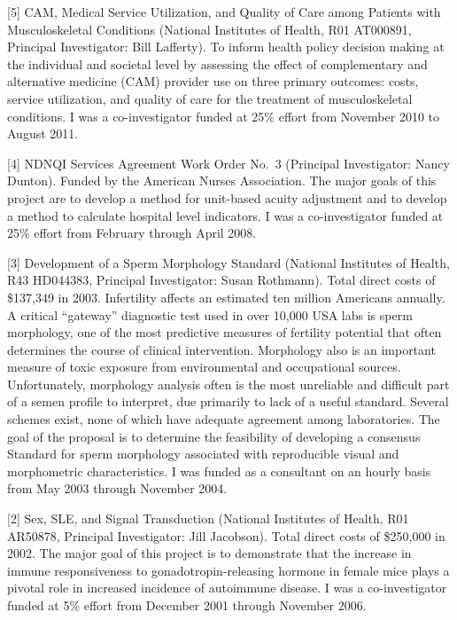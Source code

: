 \documentclass[
  12pt,
]{article}
\begin{document}
{[}5{]} CAM, Medical Service Utilization, and Quality of Care among
Patients with Musculoskeletal Conditions (National Institutes of Health,
R01 AT000891, Principal Investigator: Bill Lafferty). To inform health
policy decision making at the individual and societal level by assessing
the effect of complementary and alternative medicine (CAM) provider use
on three primary outcomes: costs, service utilization, and quality of
care for the treatment of musculoskeletal conditions. I was a
co-investigator funded at 25\% effort from November 2010 to August 2011.

{[}4{]} NDNQI Services Agreement Work Order No.~3 (Principal
Investigator: Nancy Dunton). Funded by the American Nurses Association.
The major goals of this project are to develop a method for unit-based
acuity adjustment and to develop a method to calculate hospital level
indicators. I was a co-investigator funded at 25\% effort from February
through April 2008.

{[}3{]} Development of a Sperm Morphology Standard (National Institutes
of Health, R43 HD044383, Principal Investigator: Susan Rothmann). Total
direct costs of \$137,349 in 2003. Infertility affects an estimated ten
million Americans annually. A critical ``gateway'' diagnostic test used
in over 10,000 USA labs is sperm morphology, one of the most predictive
measures of fertility potential that often determines the course of
clinical intervention. Morphology also is an important measure of toxic
exposure from environmental and occupational sources. Unfortunately,
morphology analysis often is the most unreliable and difficult part of a
semen profile to interpret, due primarily to lack of a useful standard.
Several schemes exist, none of which have adequate agreement among
laboratories. The goal of the proposal is to determine the feasibility
of developing a consensus Standard for sperm morphology associated with
reproducible visual and morphometric characteristics. I was funded as a
consultant on an hourly basis from May 2003 through November 2004.

{[}2{]} Sex, SLE, and Signal Transduction (National Institutes of
Health, R01 AR50878, Principal Investigator: Jill Jacobson). Total
direct costs of \$250,000 in 2002. The major goal of this project is to
demonstrate that the increase in immune responsiveness to
gonadotropin-releasing hormone in female mice plays a pivotal role in
increased incidence of autoimmune disease. I was a co-investigator
funded at 5\% effort from December 2001 through November 2006.
\end{document}
